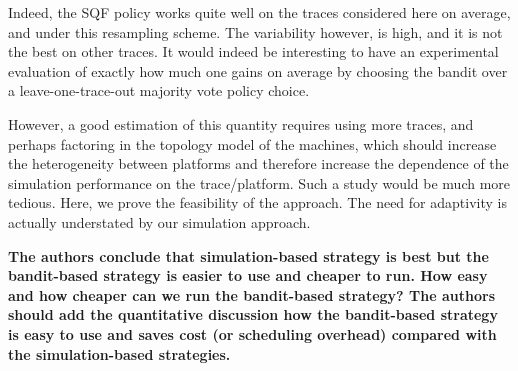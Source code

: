 \documentclass[]{article}
\begin{document}
Indeed, the SQF policy works quite well on the traces considered here on average, and
under this resampling scheme. The variability however, is high, and it is not the best
on other traces.
It would indeed be interesting to have an experimental evaluation of exactly how much
one gains on average by choosing the bandit over a leave-one-trace-out majority vote policy
choice.

However, a good estimation of this quantity requires using more traces, and perhaps factoring
in the topology model of the machines, which should increase the heterogeneity between platforms
and therefore increase the dependence of the simulation performance on the trace/platform.
Such a study would be much more tedious.
Here, we prove the feasibility of the approach. The need for adaptivity is actually understated
by our simulation approach.

\textbf{The authors conclude that simulation-based strategy is best but the bandit-based strategy is easier to use and cheaper
to run. How easy and how cheaper can we run the bandit-based strategy? The authors should add the quantitative
discussion how the bandit-based strategy is easy to use and saves cost (or scheduling overhead) compared with the
simulation-based strategies.
}



\end{document}
